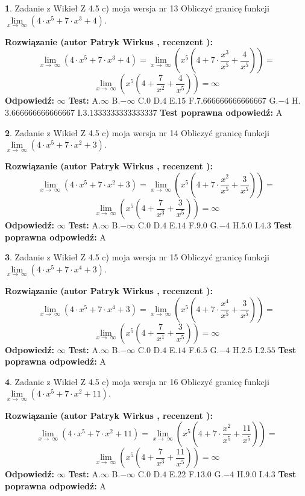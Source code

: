 \documentclass[12pt, a4paper]{article}
\theoremstyle{definition} %
\newtheorem{zad}{}
\newcommand{\zadStart}[1]{\begin{zad}#1\newline}
\newcommand{\zadStop}{\end{zad}}
\newcommand{\rozwStart}[2]{\noindent \textbf{Rozwiązanie (autor #1 , recenzent #2): }\newline}
\newcommand{\rozwStop}{\newline}
\newcommand{\odpStart}{\noindent \textbf{Odpowiedź:}\newline}
\newcommand{\odpStop}{\newline}
\newcommand{\testStart}{\noindent \textbf{Test:}\newline}
\newcommand{\testStop}{\newline}
\newcommand{\kluczStart}{\noindent \textbf{Test poprawna odpowiedź:}\newline}
\newcommand{\kluczStop}{\newline}
\begin{document}
\zadStart{Zadanie z Wikieł Z 4.5 c) moja wersja nr 13}
Obliczyć granicę funkcji  $\lim\limits_{x\to\ \infty}(4 \cdot x^{5}+7 \cdot x^{3}+4)$.
\zadStop
\rozwStart{Patryk Wirkus}{}
$$\lim\limits_{x\to\ \infty}(4 \cdot x^{5}+7 \cdot x^{3}+4) = \lim\limits_{x\to\ \infty}(x^{5}(4 +7 \cdot \frac{x^{3}}{x^{5}}+\frac{4}{x^{5}})) =$$ $$\lim\limits_{x\to\ \infty}(x^{5}(4 +\frac{7}{x^{2}}+\frac{4}{x^{5}})) =\infty$$
\rozwStop
\odpStart
$\infty$
\odpStop
\testStart
A.$\infty$ B.$-\infty$ C.$0$ D.$4$ E.$15$
F.$7.666666666666667$ G.$-4$
H.$3.666666666666667$
I.$3.1333333333333337$
\testStop
\kluczStart
A
\kluczStop



\zadStart{Zadanie z Wikieł Z 4.5 c) moja wersja nr 14}
Obliczyć granicę funkcji  $\lim\limits_{x\to\ \infty}(4 \cdot x^{5}+7 \cdot x^{2}+3)$.
\zadStop
\rozwStart{Patryk Wirkus}{}
$$\lim\limits_{x\to\ \infty}(4 \cdot x^{5}+7 \cdot x^{2}+3) = \lim\limits_{x\to\ \infty}(x^{5}(4 +7 \cdot \frac{x^{2}}{x^{5}}+\frac{3}{x^{5}})) =$$ $$\lim\limits_{x\to\ \infty}(x^{5}(4 +\frac{7}{x^{3}}+\frac{3}{x^{5}})) =\infty$$
\rozwStop
\odpStart
$\infty$
\odpStop
\testStart
A.$\infty$ B.$-\infty$ C.$0$ D.$4$ E.$14$
F.$9.0$ G.$-4$
H.$5.0$
I.$4.3$
\testStop
\kluczStart
A
\kluczStop



\zadStart{Zadanie z Wikieł Z 4.5 c) moja wersja nr 15}
Obliczyć granicę funkcji  $\lim\limits_{x\to\ \infty}(4 \cdot x^{5}+7 \cdot x^{4}+3)$.
\zadStop
\rozwStart{Patryk Wirkus}{}
$$\lim\limits_{x\to\ \infty}(4 \cdot x^{5}+7 \cdot x^{4}+3) = \lim\limits_{x\to\ \infty}(x^{5}(4 +7 \cdot \frac{x^{4}}{x^{5}}+\frac{3}{x^{5}})) =$$ $$\lim\limits_{x\to\ \infty}(x^{5}(4 +\frac{7}{x^{1}}+\frac{3}{x^{5}})) =\infty$$
\rozwStop
\odpStart
$\infty$
\odpStop
\testStart
A.$\infty$ B.$-\infty$ C.$0$ D.$4$ E.$14$
F.$6.5$ G.$-4$
H.$2.5$
I.$2.55$
\testStop
\kluczStart
A
\kluczStop



\zadStart{Zadanie z Wikieł Z 4.5 c) moja wersja nr 16}
Obliczyć granicę funkcji  $\lim\limits_{x\to\ \infty}(4 \cdot x^{5}+7 \cdot x^{2}+11)$.
\zadStop
\rozwStart{Patryk Wirkus}{}
$$\lim\limits_{x\to\ \infty}(4 \cdot x^{5}+7 \cdot x^{2}+11) = \lim\limits_{x\to\ \infty}(x^{5}(4 +7 \cdot \frac{x^{2}}{x^{5}}+\frac{11}{x^{5}})) =$$ $$\lim\limits_{x\to\ \infty}(x^{5}(4 +\frac{7}{x^{3}}+\frac{11}{x^{5}})) =\infty$$
\rozwStop
\odpStart
$\infty$
\odpStop
\testStart
A.$\infty$ B.$-\infty$ C.$0$ D.$4$ E.$22$
F.$13.0$ G.$-4$
H.$9.0$
I.$4.3$
\testStop
\kluczStart
A
\kluczStop
\end{document}

